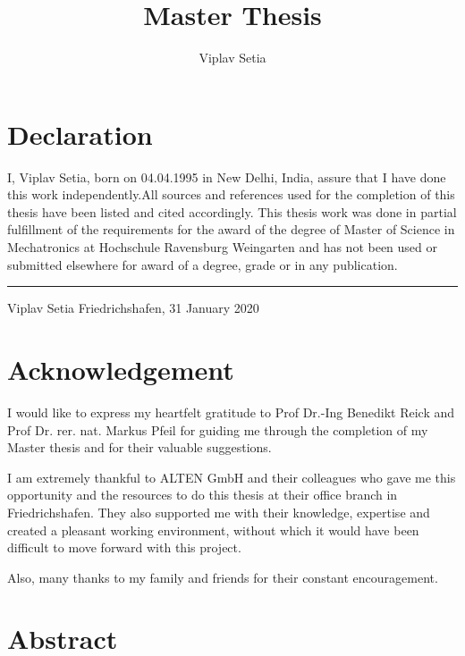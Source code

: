 \documentclass[%
xelatex,
	oneside,		%
	12pt,			%
	parskip=half,	%
	headsepline,	%
	footsepline,	%
	abstracton,
	chapterprefix=true%
    appendixprefix=true]
{scrreprt}
\title{Master Thesis}
\author{Viplav Setia}
\begin{document}
	

	
\section*{\Large\normalfont\bfseries Declaration}

I, Viplav Setia, born on 04.04.1995 in New Delhi, India, assure that I have done this work independently.All sources and references used for the completion of this
thesis have been listed and cited accordingly. This thesis work was done in
partial fulfillment of the requirements for the award of the degree of Master of
Science in Mechatronics at Hochschule Ravensburg Weingarten and has not been
used or submitted elsewhere for award of a degree, grade or in any publication. \newline


\rule{5cm}{.4pt}

Viplav Setia \newline
Friedrichshafen, 31 January 2020
\clearpage

		\section*{\Large\normalfont\bfseries Acknowledgement}

I would like to express my heartfelt
gratitude to Prof Dr.-Ing Benedikt Reick and Prof Dr. rer. nat. Markus Pfeil for guiding me through the completion of my Master thesis and for their valuable
suggestions.

I am extremely thankful to ALTEN GmbH and their colleagues who gave me this opportunity and the resources to do this thesis at their office branch in Friedrichshafen. They also supported me with their knowledge,  expertise and created a pleasant working environment, without which it would have been difficult to move forward with this project.

Also, many thanks to my family and friends for their constant encouragement.				
	\clearpage
		\section*{\Large\normalfont\bfseries Abstract}
\end{document}
